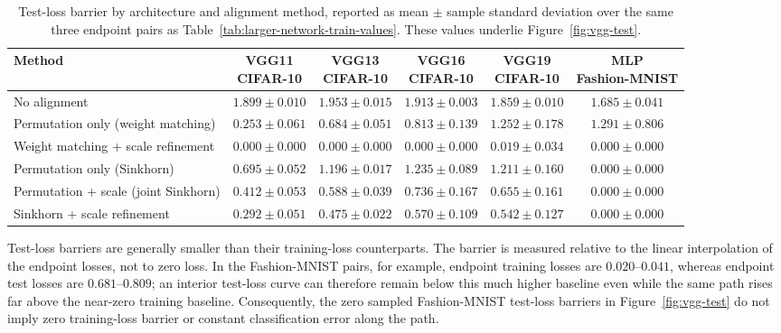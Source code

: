 \documentclass[twoside]{article}
\begin{document}
\begin{table}[H]
    \centering
    \small
    \setlength{\tabcolsep}{4pt}
    \begin{tabular}{lccccc}
        \toprule
        Method & \shortstack{VGG11\\CIFAR-10} & \shortstack{VGG13\\CIFAR-10}
        & \shortstack{VGG16\\CIFAR-10} & \shortstack{VGG19\\CIFAR-10}
        & \shortstack{MLP\\Fashion-MNIST} \\
        \midrule
        No alignment & $1.899\pm0.010$ & $1.953\pm0.015$ & $1.913\pm0.003$
            & $1.859\pm0.010$ & $1.685\pm0.041$ \\
        Permutation only (weight matching)
            & $0.253\pm0.061$ & $0.684\pm0.051$ & $0.813\pm0.139$
            & $1.252\pm0.178$ & $1.291\pm0.806$ \\
        Weight matching + scale refinement
            & $0.000\pm0.000$ & $0.000\pm0.000$ & $0.000\pm0.000$
            & $0.019\pm0.034$ & $0.000\pm0.000$ \\
        Permutation only (Sinkhorn)
            & $0.695\pm0.052$ & $1.196\pm0.017$ & $1.235\pm0.089$
            & $1.211\pm0.160$ & $0.000\pm0.000$ \\
        Permutation + scale (joint Sinkhorn)
            & $0.412\pm0.053$ & $0.588\pm0.039$ & $0.736\pm0.167$
            & $0.655\pm0.161$ & $0.000\pm0.000$ \\
        Sinkhorn + scale refinement
            & $0.292\pm0.051$ & $0.475\pm0.022$ & $0.570\pm0.109$
            & $0.542\pm0.127$ & $0.000\pm0.000$ \\
        \bottomrule
    \end{tabular}
    \caption{Test-loss barrier by architecture and alignment method,
    reported as mean $\pm$ sample standard deviation over the same three
    endpoint pairs as Table~\ref{tab:larger-network-train-values}.  These values
    underlie Figure~\ref{fig:vgg-test}.}
    \label{tab:larger-network-test-values}
\end{table}

Test-loss barriers are generally smaller than their training-loss counterparts.
The barrier is measured relative to the linear interpolation of the endpoint
losses, not to zero loss.  In the
Fashion-MNIST pairs, for example, endpoint training losses are
$0.020$--$0.041$, whereas endpoint test losses are $0.681$--$0.809$; an
interior test-loss curve can therefore remain below this much higher baseline
even while the same path rises far above the near-zero training baseline.
Consequently, the zero sampled Fashion-MNIST test-loss barriers in
Figure~\ref{fig:vgg-test} do not imply zero training-loss barrier or constant
classification error along the path.
\end{document}
